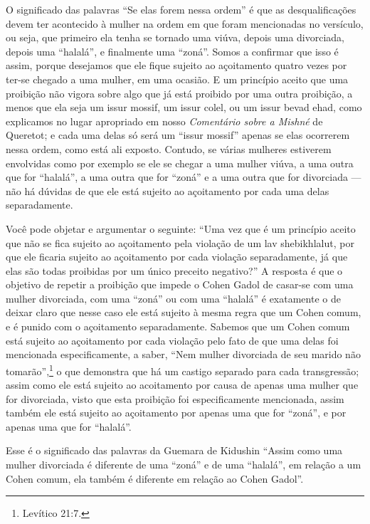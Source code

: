 O significado das palavras ``Se elas forem nessa ordem'' é que as
desqualificações devem ter acontecido à mulher na ordem em que foram
mencionadas no versículo, ou seja, que primeiro ela tenha se tornado uma
viúva, depois uma divorciada, depois uma ``halalá'', e finalmente uma
``zoná''. Somos a confirmar que isso é assim, porque desejamos que ele
fique sujeito ao açoitamento quatro vezes por ter-se chegado a uma
mulher, em uma ocasião. E um princípio aceito que uma proibição não
vigora sobre algo que já está proibido por uma outra proibição, a menos
que ela seja um issur mossif,\starr{} um issur
colel,\starr{} ou um issur bevad
ehad,\starr{} como explicamos no lugar apropriado em
nosso \emph{Comentário sobre a Mishné} de Queretot; e cada uma delas só
será um ``issur mossif'' apenas se elas ocorrerem nessa ordem, como está
ali exposto. Contudo, se várias mulheres estiverem envolvidas como por
exemplo se ele se chegar a uma mulher viúva, a uma outra que for
``halalá'', a uma outra que for ``zoná'' e a uma outra que for
divorciada --- não há dúvidas de que ele está sujeito ao açoitamento por
cada uma delas separadamente.

Você pode objetar e argumentar o seguinte: ``Uma vez que é um princípio
aceito que não se fica sujeito ao açoitamento pela violação de um lav
shebikhlalut,\starr{} por que ele ficaria sujeito ao
açoitamento por cada violação separadamente, já que elas são todas
proibidas por um único preceito negativo?'' A resposta é que o objetivo
de repetir a proibição que impede o Cohen Gadol de casar-se com uma
mulher divorciada, com uma ``zoná'' ou com uma ``halalá'' é exatamente o
de deixar claro que nesse caso ele está sujeito à mesma regra que um
Cohen comum, e é punido com o açoitamento separadamente. Sabemos
que um Cohen comum está sujeito ao açoitamento por cada violação
pelo fato de que uma delas foi mencionada especificamente, a saber,
``Nem mulher divorciada de seu marido não tomarão'',\footnote{Levítico 21:7.} o
que demonstra que há um castigo separado para cada transgressão; assim
como ele está sujeito ao acoitamento por causa de apenas uma mulher que
for divorciada, visto que esta proibição foi especificamente mencionada,
assim também ele está sujeito ao açoitamento por apenas uma que for
``zoná'', e por apenas uma que for ``halalá''.


Esse é o significado das palavras da Guemara de Kidushin ``Assim como
uma mulher divorciada é diferente de uma ``zoná'' e de uma ``halalá'', em
relação a um Cohen comum, ela também é diferente em relação ao Cohen Gadol''.

